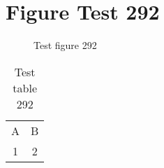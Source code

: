\documentclass{article}
\begin{document}
\section{Figure Test 292}
\begin{figure}[h]
\caption{Test figure 292}
\end{figure}
\begin{table}[h]
\caption{Test table 292}
\begin{tabular}{cc}
A & B \\
1 & 2
\end{tabular}
\end{table}
\end{document}
